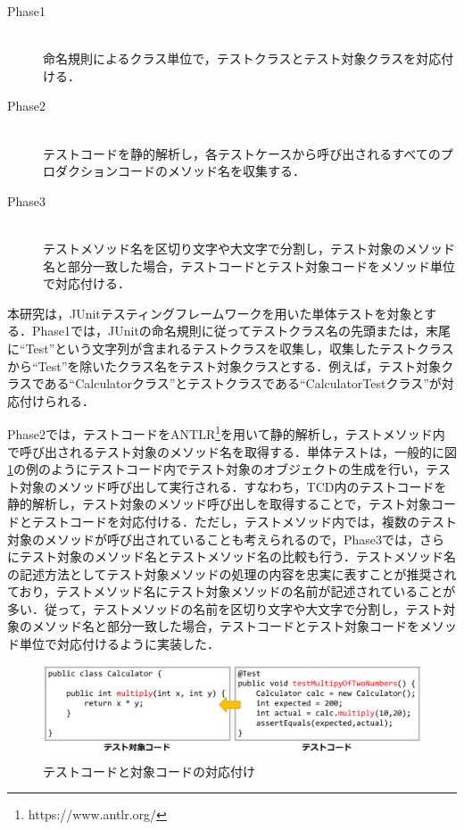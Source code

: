 \documentclass[12pt]{jarticle} %
\begin{document}
\begin{description}
\item[Phase1]~\\
命名規則によるクラス単位で，テストクラスとテスト対象クラスを対応付ける．
\item[Phase2]~\\
テストコードを静的解析し，各テストケースから呼び出されるすべてのプロダクションコードのメソッド名を収集する．
\item[Phase3]~\\
テストメソッド名を区切り文字や大文字で分割し，テスト対象のメソッド名と部分一致した場合，テストコードとテスト対象コードをメソッド単位で対応付ける．
\end{description}


本研究は，JUnitテスティングフレームワークを用いた単体テストを対象とする．Phase1では，JUnitの命名規則に従ってテストクラス名の先頭または，末尾に``Test''という文字列が含まれるテストクラスを収集し，収集したテストクラスから``Test''を除いたクラス名をテスト対象クラスとする．例えば，テスト対象クラスである``Calculatorクラス''とテストクラスである``CalculatorTestクラス''が対応付けられる．

Phase2では，テストコードをANTLR\footnote{https://www.antlr.org/}を用いて静的解析し，テストメソッド内で呼び出されるテスト対象のメソッド名を取得する．単体テストは，一般的に図\ref{mapping}の例のようにテストコード内でテスト対象のオブジェクトの生成を行い，テスト対象のメソッド呼び出して実行される．すなわち，TCD内のテストコードを静的解析し，テスト対象のメソッド呼び出しを取得することで，テスト対象コードとテストコードを対応付ける．ただし，テストメソッド内では，複数のテスト対象のメソッドが呼び出されていることも考えられるので，Phase3では，さらにテスト対象のメソッド名とテストメソッド名の比較も行う．テストメソッド名の記述方法としてテスト対象メソッドの処理の内容を忠実に表すことが推奨されており，テストメソッド名にテスト対象メソッドの名前が記述されていることが多い\cite{b22}．従って，テストメソッドの名前を区切り文字や大文字で分割し，テスト対象のメソッド名と部分一致した場合，テストコードとテスト対象コードをメソッド単位で対応付けるように実装した．

\begin{figure}[htbp]
\begin{center}
\includegraphics[clip,width=15cm]{pic/mapping.pdf}
\caption{テストコードと対象コードの対応付け}
\label{mapping}
\end{center}
\end{figure}
\end{document}
